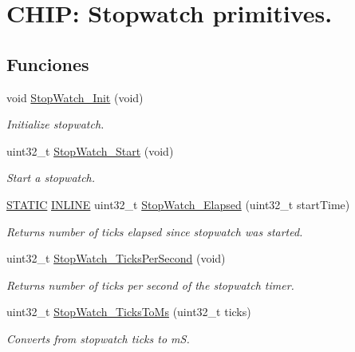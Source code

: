 \hypertarget{group___stop___watch}{}\section{C\+H\+IP\+: Stopwatch primitives.}
\label{group___stop___watch}
\subsection*{Funciones}
\begin{DoxyCompactItemize}
\item 
void \hyperlink{group___stop___watch_gaa0f8ea277b700d20b4322a15d9ddf32c}{Stop\+Watch\+\_\+\+Init} (void)
\begin{DoxyCompactList}\small\item\em Initialize stopwatch. \end{DoxyCompactList}\item 
uint32\+\_\+t \hyperlink{group___stop___watch_ga0dbab611d6cbdd4faad5018131aca140}{Stop\+Watch\+\_\+\+Start} (void)
\begin{DoxyCompactList}\small\item\em Start a stopwatch. \end{DoxyCompactList}\item 
\hyperlink{group___l_p_c___types___public___macros_ga10b2d890d871e1489bb02b7e70d9bdfb}{S\+T\+A\+T\+IC} \hyperlink{spifi__18xx__43xx_8h_a2eb6f9e0395b47b8d5e3eeae4fe0c116}{I\+N\+L\+I\+NE} uint32\+\_\+t \hyperlink{group___stop___watch_ga0a0b6b9a4391ae5f4fcccb22a2a35f73}{Stop\+Watch\+\_\+\+Elapsed} (uint32\+\_\+t start\+Time)
\begin{DoxyCompactList}\small\item\em Returns number of ticks elapsed since stopwatch was started. \end{DoxyCompactList}\item 
uint32\+\_\+t \hyperlink{group___stop___watch_gae780d65d75ed3ca6dbd33389479eed9f}{Stop\+Watch\+\_\+\+Ticks\+Per\+Second} (void)
\begin{DoxyCompactList}\small\item\em Returns number of ticks per second of the stopwatch timer. \end{DoxyCompactList}\item 
uint32\+\_\+t \hyperlink{group___stop___watch_gab62ee68f7b01b5c14b0d19c3c391ca02}{Stop\+Watch\+\_\+\+Ticks\+To\+Ms} (uint32\+\_\+t ticks)
\begin{DoxyCompactList}\small\item\em Converts from stopwatch ticks to mS. \end{DoxyCompactList}\item 

\end{DoxyCompactItemize}
